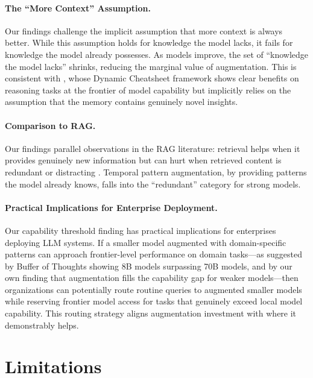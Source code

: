 \documentclass[11pt]{article}
\begin{document}
\paragraph{The ``More Context'' Assumption.} Our findings challenge the implicit assumption that more context is always better. While this assumption holds for knowledge the model lacks, it fails for knowledge the model already possesses. As models improve, the set of ``knowledge the model lacks'' shrinks, reducing the marginal value of augmentation. This is consistent with \citet{suzgun2025dynamic}, whose Dynamic Cheatsheet framework shows clear benefits on reasoning tasks at the frontier of model capability but implicitly relies on the assumption that the memory contains genuinely novel insights.

\paragraph{Comparison to RAG.} Our findings parallel observations in the RAG literature: retrieval helps when it provides genuinely new information but can hurt when retrieved content is redundant or distracting \citep{shi2023large}. Temporal pattern augmentation, by providing patterns the model already knows, falls into the ``redundant'' category for strong models.

\paragraph{Practical Implications for Enterprise Deployment.} Our capability threshold finding has practical implications for enterprises deploying LLM systems. If a smaller model augmented with domain-specific patterns can approach frontier-level performance on domain tasks---as suggested by Buffer of Thoughts \citep{yang2024buffer} showing 8B models surpassing 70B models, and by our own finding that augmentation fills the capability gap for weaker models---then organizations can potentially route routine queries to augmented smaller models while reserving frontier model access for tasks that genuinely exceed local model capability. This routing strategy aligns augmentation investment with where it demonstrably helps.

\section{Limitations}
\label{sec:limitations}
\end{document}
